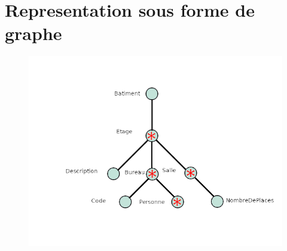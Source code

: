 \chapter{Representation sous forme de graphe}
\begin{figure}
  \includegraphics[width=\linewidth]{graphe_dtd_to_rel.png}
\end{figure}
